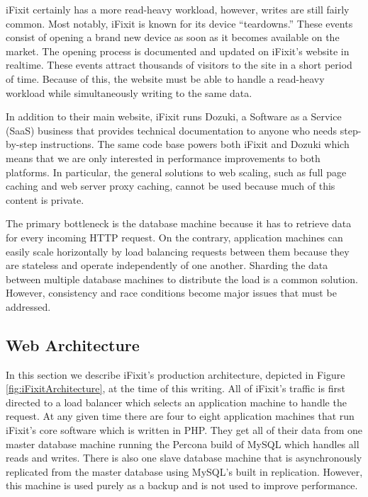 \documentclass[12pt]{ucthesis}
\begin{document}
\textsf{iFixit} certainly has a more read-heavy workload, however, writes are still fairly common.
Most notably, \textsf{iFixit} is known for its device ``teardowns.''
These events consist of opening a brand new device as soon as it becomes available on the market.
The opening process is documented and updated on \textsf{iFixit}'s website in realtime.
These events attract thousands of visitors to the site in a short period of time.
Because of this, the website must be able to handle a read-heavy workload while simultaneously writing to the same data.

In addition to their main website, \textsf{iFixit} runs \textsf{Dozuki}, a Software as a Service (SaaS) business that provides technical documentation to anyone who needs step-by-step instructions.
The same code base powers both \textsf{iFixit} and \textsf{Dozuki} which means that we are only interested in performance improvements to both platforms.
In particular, the general solutions to web scaling, such as full page caching and web server proxy caching, cannot be used because much of this content is private.

The primary bottleneck is the database machine because it has to retrieve data for every incoming HTTP request.
On the contrary, application machines can easily scale horizontally by load balancing requests between them because they are stateless and operate independently of one another.
Sharding the data between multiple database machines to distribute the load is a common solution.
However, consistency and race conditions become major issues that must be addressed.

\subsection{Web Architecture}
In this section we describe \textsf{iFixit}'s production architecture, depicted in Figure \ref{fig:iFixitArchitecture}, at the time of this writing.
All of \textsf{iFixit}'s traffic is first directed to a load balancer which selects an application machine to handle the request.
At any given time there are four to eight application machines that run \textsf{iFixit}'s core software which is written in PHP.
They get all of their data from one master database machine running the Percona build of \textsf{MySQL} which handles all reads and writes.
There is also one slave database machine that is asynchronously replicated from the master database using \textsf{MySQL}'s built in replication.
However, this machine is used purely as a backup and is not used to improve performance.
\end{document}
